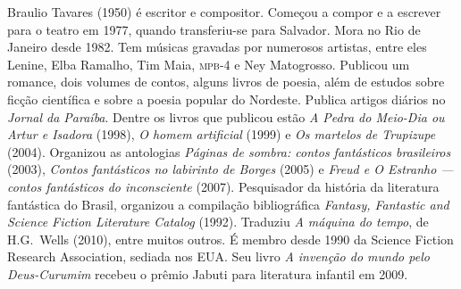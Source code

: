 \begin{resumopage}
\item[Braulio Tavares] (1950) é escritor e compositor. Começou a compor e a escrever 
para o teatro em 1977, quando transferiu-se para Salvador. Mora no Rio de Janeiro desde 1982. 
Tem músicas gravadas por numerosos artistas, entre eles Lenine, Elba Ramalho, Tim Maia, \textsc{mpb}-4 
e Ney Matogrosso. Publicou um romance, dois volumes de contos, alguns livros de poesia, além de 
estudos sobre ficção científica e sobre a poesia popular do Nordeste. Publica artigos diários 
no \textit{Jornal da Paraíba}. Dentre os livros que publicou estão \textit{A Pedra do 
Meio-Dia ou Artur e Isadora} (1998), \textit{O homem artificial} (1999) e \textit{Os martelos de Trupizupe}
(2004). Organizou as antologias \textit{Páginas de sombra: contos fantásticos brasileiros} (2003), 
\textit{Contos fantásticos no labirinto de Borges} (2005) e \textit{Freud e 
O Estranho --- contos fantásticos do inconsciente} (2007). Pesquisador da história da literatura fantástica 
do Brasil, organizou a compilação bibliográfica \textit{Fantasy, Fantastic and 
Science Fiction Literature Catalog} (1992). Traduziu \textit{A máquina do tempo}, 
de H.G.~Wells (2010), entre muitos outros. É membro desde 1990 da Science 
Fiction Research Association, sediada nos EUA. Seu livro \textit{A invenção do mundo pelo Deus-Curumim} 
recebeu o prêmio Jabuti para literatura infantil em 2009.


\end{resumopage}

